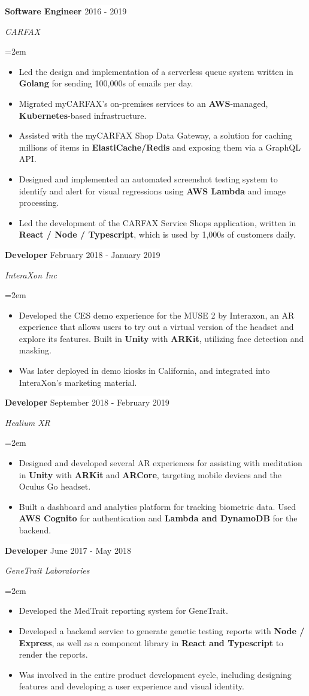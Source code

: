 \documentclass[paper=a4,fontsize=9pt]{scrartcl} %
\newcommand{\sepspace}{\vspace*{0.8em}}		%
\newcommand{\EducationEntry}[4]{
			\noindent \textbf{#1} \hfill      %
			\colorbox{Black}{%
				\parbox{6em}{%
				\hfill\color{White}#2}} \par  %
			\noindent \textit{#3} \par        %
			\noindent\hangindent=2em\hangafter=0 \small #4 %
			\normalsize \par}
\newcommand{\WorkEntry}[4]{				  %
			\noindent \textbf{#1} \hfill      %
			\colorbox{White}{\color{Black}#2} \par  %
			\noindent \textit{#3} \par              %
			\noindent\hangindent=2em\hangafter=0 \small #4 %
			\normalsize \par}
\begin{document}
	\WorkEntry{Software Engineer}{2016 - 2019}{CARFAX}{
		\begin{itemize}
			\item Led the design and implementation of a serverless queue system written in \textbf{Golang} for sending 100,000s of emails per day.
			\item Migrated myCARFAX's on-premises services to an \textbf{AWS}-managed, \textbf{Kubernetes}-based infrastructure.
			\item Assisted with the myCARFAX Shop Data Gateway, a solution for caching millions of items in \textbf{ElastiCache/Redis} and exposing them via a GraphQL API.
			\item Designed and implemented an automated screenshot testing system to identify and alert for visual regressions using \textbf{AWS Lambda} and image processing.
			\item Led the development of the CARFAX Service Shops application, written in \textbf{React / Node / Typescript}, which is used by 1,000s of customers daily.
		\end{itemize}
	}
	\sepspace
	
	\WorkEntry{Developer}{February 2018 - January 2019}{InteraXon Inc}{
		\begin{itemize}
			\item Developed the CES demo experience for the MUSE 2 by Interaxon, an AR experience that allows users to try out a virtual version of the headset and explore its features. Built in \textbf{Unity} with \textbf{ARKit}, utilizing face detection and masking.
			\item Was later deployed in demo kiosks in California, and integrated into InteraXon's marketing material.
		\end{itemize}
	}
	\sepspace


	\WorkEntry{Developer}{September 2018 - February 2019}{Healium XR}{
		\begin{itemize}
			\item Designed and developed several AR experiences for assisting with meditation in \textbf{Unity} with \textbf{ARKit} and \textbf{ARCore}, targeting mobile devices and the Oculus Go headset.
			\item Built a dashboard and analytics platform for tracking biometric data. Used \textbf{AWS Cognito} for authentication and \textbf{Lambda and DynamoDB} for the backend.
		\end{itemize}
	}
	\sepspace

	\WorkEntry{Developer}{June 2017 - May 2018}{GeneTrait Laboratories}{
		\begin{itemize}
			\item Developed the MedTrait reporting system for GeneTrait.
			\item Developed a backend service to generate genetic testing reports with \textbf{Node / Express}, as well as a component library in \textbf{React and Typescript} to render the reports.
			\item Was involved in the entire product development cycle, including designing features and developing a user experience and visual identity.
		\end{itemize}
	}
	\sepspace
\end{document}

